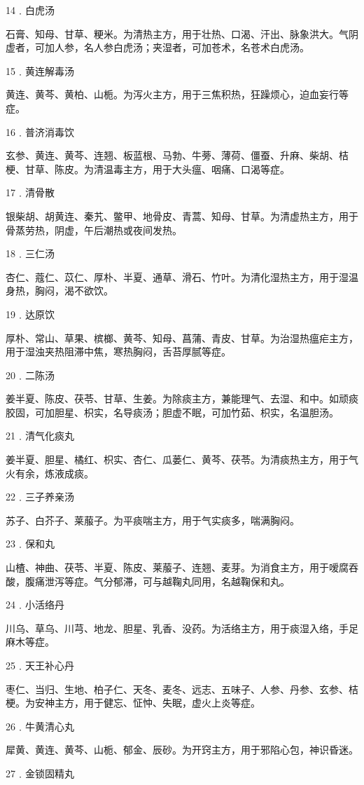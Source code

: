 \documentclass[a4paper,12pt,UTF8,twoside]{ctexbook}
\begin{document}
14﹒白虎汤

石膏、知母、甘草、粳米。为清热主方，用于壮热、口渴、汗出、脉象洪大。气阴虚者，可加人参，名人参白虎汤；夹湿者，可加苍术，名苍术白虎汤。

15﹒黄连解毒汤

黄连、黄芩、黄柏、山栀。为泻火主方，用于三焦积热，狂躁烦心，迫血妄行等症。

16﹒普济消毒饮

玄参、黄连、黄芩、连翘、板蓝根、马勃、牛蒡、薄荷、僵蚕、升麻、柴胡、桔梗、甘草、陈皮。为清温毒主方，用于大头瘟、咽痛、口渴等症。

17﹒清骨散

银柴胡、胡黄连、秦艽、鳖甲、地骨皮、青蒿、知母、甘草。为清虚热主方，用于骨蒸劳热，阴虚，午后潮热或夜间发热。

18﹒三仁汤

杏仁、蔻仁、苡仁、厚朴、半夏、通草、滑石、竹叶。为清化湿热主方，用于湿温身热，胸闷，渴不欲饮。

19﹒达原饮

厚朴、常山、草果、槟榔、黄芩、知母、菖蒲、青皮、甘草。为治湿热瘟疟主方，用于湿浊夹热阻滞中焦，寒热胸闷，舌苔厚腻等症。

20﹒二陈汤

姜半夏、陈皮、茯苓、甘草、生姜。为除痰主方，兼能理气、去湿、和中。如顽痰胶固，可加胆星、枳实，名导痰汤；胆虚不眠，可加竹茹、枳实，名温胆汤。

21﹒清气化痰丸

姜半夏、胆星、橘红、枳实、杏仁、瓜蒌仁、黄芩、茯苓。为清痰热主方，用于气火有余，炼液成痰。

22﹒三子养亲汤

苏子、白芥子、莱菔子。为平痰喘主方，用于气实痰多，喘满胸闷。

23﹒保和丸

山楂、神曲、茯苓、半夏、陈皮、莱菔子、连翘、麦芽。为消食主方，用于嗳腐吞酸，腹痛泄泻等症。气分郁滞，可与越鞠丸同用，名越鞠保和丸。

24﹒小活络丹

川乌、草乌、川芎、地龙、胆星、乳香、没药。为活络主方，用于痰湿入络，手足麻木等症。

25﹒天王补心丹

枣仁、当归、生地、柏子仁、天冬、麦冬、远志、五味子、人参、丹参、玄参、桔梗。为安神主方，用于健忘、怔忡、失眠，虚火上炎等症。

26﹒牛黄清心丸

犀黄、黄连、黄芩、山栀、郁金、辰砂。为开窍主方，用于邪陷心包，神识昏迷。

27﹒金锁固精丸
\end{document}
